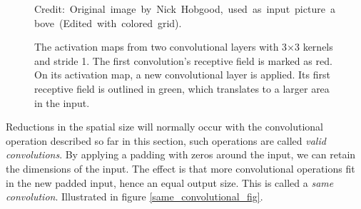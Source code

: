     \begin{figure}[H]
        \centering
        
        
        \caption[Receptive field]{The activation maps from two convolutional layers with 3×3 kernels and stride 1. The first convolution's receptive field is marked as red. On its activation map, a new convolutional layer is applied. Its first receptive field is outlined in green, which translates to a larger area in the input.}
      	\medskip 
        \hspace*{15pt}\hbox{\scriptsize Credit: Original image by Nick Hobgood\cite{clownfish_image}, used as input picture above (Edited with colored grid).}
        \label{receptive_field_fig}
    \end{figure}

    
    Reductions in the spatial size will normally occur with the convolutional operation described so far in this section, such operations are called \textit{valid convolutions}\cite{o2015introduction_convolutions}. By applying a padding with zeros around the input, we can retain the dimensions of the input. The effect is that more convolutional operations fit in the new padded input, hence an equal output size. This is called a \textit{same convolution}. Illustrated in figure \ref{same_convolutional_fig}.
    
